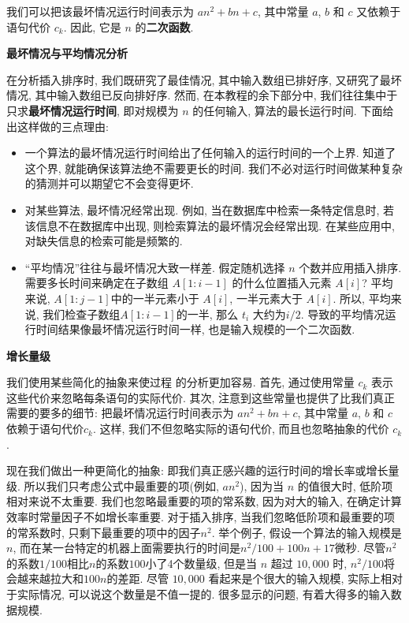 \documentclass[oneside,10pt,fontset=none]{ctexbook}
\numberwithin{definition}{chapter}
\numberwithin{theorem}{chapter}
\numberwithin{proof}{chapter}
\begin{document}
我们可以把该最坏情况运行时间表示为 $an^2+bn+c$, 其中常量 $a$, $b$ 和 $c$ 又依赖于语句代价 $c_k$. 因此, 它是 $n$ 的\textbf{二次函数}.

\textbf{最坏情况与平均情况分析}

在分析插入排序时, 我们既研究了最佳情况, 其中输入数组已排好序, 又研究了最坏情况, 其中输入数组已反向排好序. 然而, 在本教程的余下部分中, 我们往往集中于只求\textbf{最坏情况运行时间}, 即对规模为 $n$ 的任何输入, 算法的最长运行时间. 下面给出这样做的三点理由:

\begin{itemize}
    \item 一个算法的最坏情况运行时间给出了任何输入的运行时间的一个上界. 知道了这个界, 就能确保该算法绝不需要更长的时间. 我们不必对运行时间做某种复杂的猜测并可以期望它不会变得更坏.
    \item 对某些算法, 最坏情况经常出现. 例如, 当在数据库中检索一条特定信息时, 若该信息不在数据库中出现, 则检索算法的最坏情况会经常出现. 在某些应用中, 对缺失信息的检索可能是频繁的.
    \item ``平均情况''往往与最坏情况大致一样差. 假定随机选择 $n$ 个数并应用插入排序. 需要多长时间来确定在子数组 $A[1:i-1]$ 的什么位置插入元素 $A[i]$? 平均来说, $A[1:j-1]$中的一半元素小于 $A[i]$, 一半元素大于 $A[i]$. 所以, 平均来说, 我们检查子数组$A[1:i-1]$的一半, 那么 $t_i$ 大约为$i/2$. 导致的平均情况运行时间结果像最坏情况运行时间一样, 也是输入规模的一个二次函数.
\end{itemize}

\textbf{增长量级}

我们使用某些简化的抽象来使过程  的分析更加容易. 首先, 通过使用常量 $c_k$ 表示这些代价来忽略每条语句的实际代价. 其次, 注意到这些常量也提供了比我们真正需要的要多的细节: 把最坏情况运行时间表示为 $an^2+bn+c$, 其中常量 $a$, $b$ 和 $c$ 依赖于语句代价$c_k$. 这样, 我们不但忽略实际的语句代价, 而且也忽略抽象的代价 $c_k$.

现在我们做出一种更简化的抽象: 即我们真正感兴趣的运行时间的增长率或增长量级. 所以我们只考虑公式中最重要的项(例如, $an^2$), 因为当 $n$ 的值很大时, 低阶项相对来说不太重要. 我们也忽略最重要的项的常系数, 因为对大的输入, 在确定计算效率时常量因子不如增长率重要. 对于插入排序, 当我们忽略低阶项和最重要的项的常系数时, 只剩下最重要的项中的因子$n^2$. 举个例子, 假设一个算法的输入规模是$n$, 而在某一台特定的机器上面需要执行的时间是$n^2/100+100n+17$微秒. 尽管$n^2$的系数$1/100$相比$n$的系数$100$小了4个数量级, 但是当 $n$ 超过 $10,000$ 时, $n^2/100$将会越来越拉大和$100n$的差距. 尽管 $10,000$ 看起来是个很大的输入规模, 实际上相对于实际情况, 可以说这个数量是不值一提的. 很多显示的问题, 有着大得多的输入数据规模.
\end{document}
